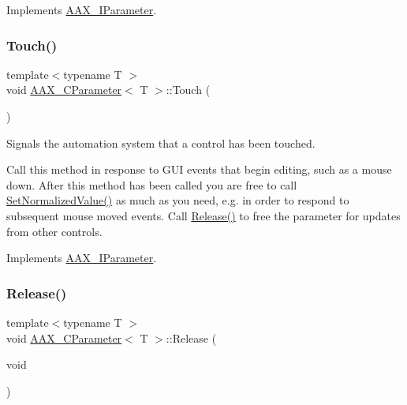 Implements \mbox{\hyperlink{a01857_a253ff336b79cfb454f07d4fa21f2884f}{A\+A\+X\+\_\+\+I\+Parameter}}.

\mbox{\label{a01537_afb023dec89c366c2f5667c2a225b1df9}} 
\subsubsection{\texorpdfstring{Touch()}{Touch()}}
{\footnotesize\ttfamily template$<$typename T $>$ \\
void \mbox{\hyperlink{a01537}{A\+A\+X\+\_\+\+C\+Parameter}}$<$ T $>$\+::Touch (\begin{DoxyParamCaption}{ }\end{DoxyParamCaption})\hspace{0.3cm}{\ttfamily [virtual]}}



Signals the automation system that a control has been touched. 

Call this method in response to G\+UI events that begin editing, such as a mouse down. After this method has been called you are free to call \mbox{\hyperlink{a01537_ac4f8ae8c5ecb2cd04ebc3aa2523449f7}{Set\+Normalized\+Value()}} as much as you need, e.\+g. in order to respond to subsequent mouse moved events. Call \mbox{\hyperlink{a01537_a52d73a61f7b7cdc7125e76617883f3fd}{Release()}} to free the parameter for updates from other controls. 

Implements \mbox{\hyperlink{a01857_a74c71243313f9d817c8bcb77550969aa}{A\+A\+X\+\_\+\+I\+Parameter}}.

\mbox{\label{a01537_a52d73a61f7b7cdc7125e76617883f3fd}} 
\subsubsection{\texorpdfstring{Release()}{Release()}}
{\footnotesize\ttfamily template$<$typename T $>$ \\
void \mbox{\hyperlink{a01537}{A\+A\+X\+\_\+\+C\+Parameter}}$<$ T $>$\+::Release (\begin{DoxyParamCaption}\item[{void}]{ }\end{DoxyParamCaption})\hspace{0.3cm}{\ttfamily [virtual]}}



